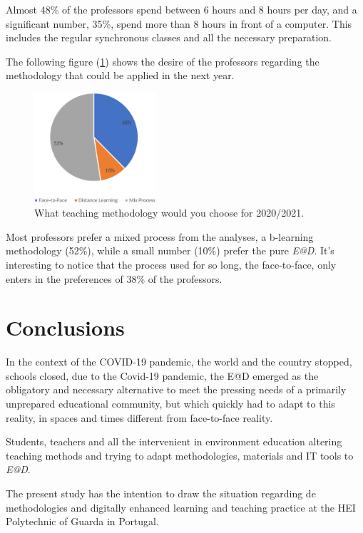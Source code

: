 \documentclass[english]{textolivre}
\begin{document}
Almost 48\% of the professors spend between 6 hours and 8 hours per day, and a significant number, 35\%, spend more than 8 hours in front of a computer. This includes the regular synchronous classes and all the necessary preparation.

The following figure (\ref{fig7}) shows the desire of the professors regarding the methodology that could be applied in the next year. 

\begin{figure}[htbp]
 \centering
 \includegraphics[width=0.4\textwidth]{Fig_007.pdf}
 \caption{What teaching methodology would you choose for 2020/2021.}
 \label{fig7}
\end{figure}

Most professors prefer a mixed process from the analyses, a b-learning methodology (52\%), while a small number (10\%) prefer the pure \emph{E@D}. It's interesting to notice that the process used for so long, the face-to-face, only enters in the preferences of 38\% of the professors.

\section{Conclusions}
In the context of the COVID-19 pandemic, the world and the country stopped, schools closed, due to the Covid-19 pandemic, the E@D emerged as the obligatory and necessary alternative to meet the pressing needs of a primarily unprepared educational community, but which quickly had to adapt to this reality, in spaces and times different from face-to-face reality. 

Students, teachers and all the intervenient in environment education altering teaching methods and trying to adapt methodologies, materials and IT tools to \emph{E@D}. 

The present study has the intention to draw the situation regarding de methodologies and digitally enhanced learning and teaching practice at the HEI Polytechnic of Guarda in Portugal.
\end{document}

